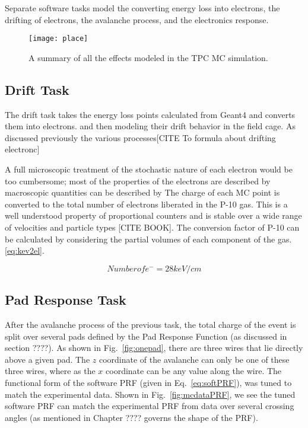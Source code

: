 Separate software tasks model the converting energy loss into electrons, the drifting of electrons, the avalanche process, and the electronics response.

\begin{figure}
\texttt{[image: place]}
\caption{A summary of all the effects modeled in the TPC MC simulation.}
\label{fig:place}
\end{figure}

\subsection{Drift Task}
The drift task takes the energy loss points calculated from Geant4 and converts them into electrons.  and then modeling their drift behavior in the field cage. As discussed previously the various processes[CITE To formula about drifting electronc]


 A full microscopic treatment of the stochastic nature of each electron would be too cumbersome; most of the properties of the electrons are described by macroscopic quantities can be described by 
The charge of each MC point is converted to the total number of electrons liberated in the P-10 gas. This is a well understood property of proportional counters and is stable over a wide range of velocities and particle types [CITE BOOK]. The conversion factor of P-10 can be calculated by considering the partial volumes of each component of the gas.  \ref{eq:kev2el}.

\begin{equation}
Number of e^{-} = 28 keV/cm
\label{eq:kev2el}
\end{equation}

\subsection{Pad Response Task}
After the avalanche process of the previous task, the total charge of the event is split over several pads defined by the Pad Response Function (as discussed in section ????). As shown in Fig.~\ref{fig:onepad}, there are three wires that lie directly above a given pad. The $z$ coordinate of the avalanche can only be one of these three wires, where as the $x$ coordinate can be any value along the wire. The functional form of the software PRF (given in Eq.~\ref{eq:softPRF}), was tuned to match the experimental data. Shown in Fig.~\ref{fig:mcdataPRF}, we see the tuned software PRF can match the experimental PRF from data over several crossing angles (as mentioned in Chapter ???? governs the shape of the PRF). 


